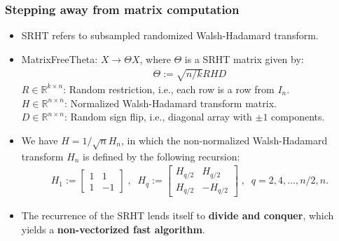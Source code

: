\documentclass[t,usepdftitle=false]{beamer}
\begin{document}
\begin{frame}
	\frametitle{Stepping away from matrix computation}	
	\begin{itemize}
		\item SRHT refers to subsampled randomized Walsh-Hadamard transform.
		\item MatrixFreeTheta: $X\rightarrow\Theta X$, where $\Theta$ is a SRHT matrix given by:
		\begin{align*}
			\Theta:=\sqrt{n/k}RHD
		\end{align*}
	$R\in\mathbb{R}^{k\times n}$: Random restriction, i.e., each row is a row from $I_n$.\\
	$H\in\mathbb{R}^{n\times n}$: Normalized Walsh-Hadamard transform matrix.\\
	$D\in\mathbb{R}^{n\times n}$: Random sign flip, i.e., diagonal array with $\pm 1$ components.\\
	\item We have $H=1/\sqrt{n}H_n$, in which the non-normalized Walsh-Hadamard transform $H_n$ is defined by the following recursion:
	\begin{align*}
		H_1:=\left[\begin{matrix}1&1\\1&-1\end{matrix}\right]
		\;,\;\;
		H_q:=\left[\begin{matrix}H_{q/2}&H_{q/2}\\H_{q/2}&-H_{q/2}\end{matrix}\right]
		\;,\;\;
		q=2,4,\dots,n/2,n.
	\end{align*}
	\item The recurrence of the SRHT lends itself to \textbf{divide and conquer}, which yields a \textbf{non-vectorized fast algorithm}.
	\end{itemize}  
\end{frame}   
\end{document}
